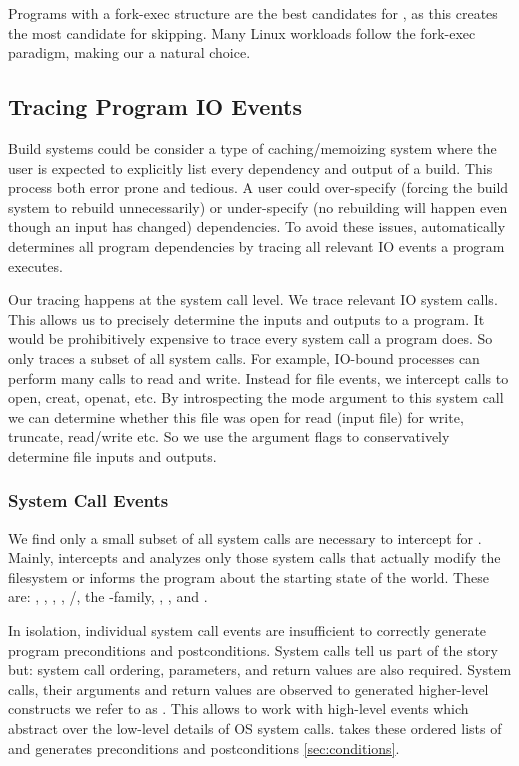 Programs with a fork-exec structure are the best candidates for \pc, as this creates the most candidate \cacheunit{} for skipping. Many Linux workloads follow the fork-exec paradigm, making our \cacheunit{} a natural choice.

\subsection{Tracing Program IO Events} \label{sec:tracing-io-events}
Build systems could be consider a type of caching/memoizing system where the user is expected to explicitly list every dependency and output of a build. This process both error prone and tedious. A user could over-specify (forcing the build system to rebuild unnecessarily) or under-specify (no rebuilding will happen even though an input has changed) dependencies. To avoid these issues, \pc automatically determines all program dependencies by tracing all relevant IO events a program executes.

Our tracing happens at the system call level. We trace relevant IO system calls. This allows us to precisely determine the inputs and outputs to a program. It would be prohibitively expensive to trace every system call a program does. So \pc only traces a subset of all system calls. For example, IO-bound processes can perform many calls to read and write. Instead for file events, we intercept calls to open, creat, openat, etc. By introspecting the mode argument to this system call we can determine whether this file was open for read (input file) for write, truncate, read/write etc. So we use the argument flags to conservatively determine file inputs and outputs.

\subsubsection{System Call Events}
We find only a small subset of all system calls are necessary to intercept for \pc. Mainly, \pc intercepts and analyzes only those system calls that actually modify the filesystem or informs the program about the starting state of the world. These are: , , , , /, the -family, , , and .

In isolation, individual system call events are insufficient to correctly generate program preconditions and postconditions. System calls tell us part of the story but: system call ordering, parameters, and return values are also required. System calls, their arguments and return values are observed to generated higher-level constructs we refer to as . This allows \pc to work with high-level events which abstract over the low-level details of OS system calls. \pc takes these ordered lists of  and generates preconditions and postconditions \ref{sec:conditions}. 

